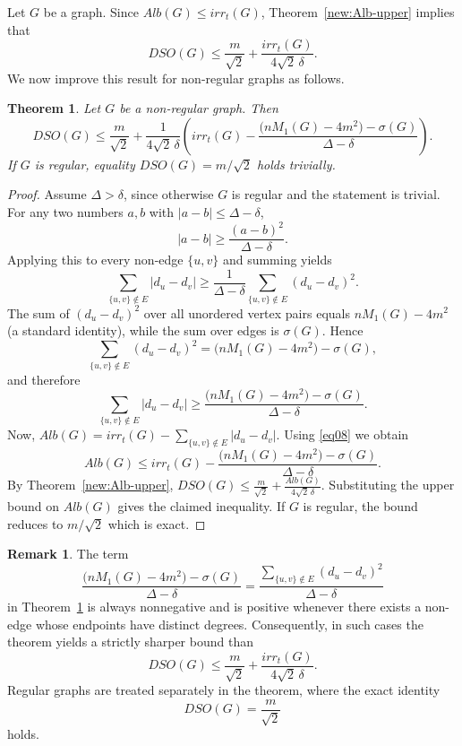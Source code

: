 \documentclass{article}
\newtheorem{theorem}{Theorem}
\theoremstyle{definition}
\newtheorem{remark}{Remark}
\begin{document}
Let $G$ be a graph.
Since $Alb(G) \le irr_t(G)$,  Theorem~\ref{new:Alb-upper} implies that
\[
DSO(G) \le \frac{m}{\sqrt{2}} + \frac{irr_t(G)}{4\sqrt{2}\,\delta}.
\]
We now improve this result for non-regular graphs as follows.
\begin{theorem}\label{new:irr-upper-implicit}
Let $G$ be a non-regular graph.
Then
\[
DSO(G) \le \frac{m}{\sqrt{2}} + \frac{1}{4\sqrt{2}\,\delta}
\left( irr_t(G) - \frac{\bigl(n M_1(G)-4m^2\bigr)-\sigma(G)}{\Delta-\delta} \right).
\]
If $G$ is regular, equality $DSO(G)=m/\sqrt{2}$ holds trivially.
\end{theorem}
\begin{proof}
Assume $\Delta>\delta$, since otherwise $G$ is regular and the statement is trivial. For any two numbers $a,b$ with $|a-b|\le \Delta-\delta$,
\[
|a-b| \ge \frac{(a-b)^2}{\Delta-\delta}.
\]
Applying this to every non-edge $\{u,v\}$ and summing yields
\[
\sum_{\{u,v\}\notin E} |d_u-d_v|
\ge \frac{1}{\Delta-\delta}\sum_{\{u,v\}\notin E} (d_u-d_v)^2.
\]
The sum of $(d_u-d_v)^2$ over all unordered vertex pairs equals $n M_1(G)-4m^2$ (a standard identity), while the sum over edges is $\sigma(G)$.
Hence
\[
\sum_{\{u,v\}\notin E} (d_u-d_v)^2 = \bigl(n M_1(G)-4m^2\bigr)-\sigma(G),
\]
and therefore
\begin{equation}\label{eq08}
\sum_{\{u,v\}\notin E} |d_u-d_v|
\ge \frac{\bigl(n M_1(G)-4m^2\bigr)-\sigma(G)}{\Delta-\delta}. 
\end{equation}
Now, $Alb(G)=irr_t(G)-\sum_{\{u,v\}\notin E}|d_u-d_v|$. Using \eqref{eq08} we obtain
\[
Alb(G) \le irr_t(G) - \frac{\bigl(n M_1(G)-4m^2\bigr)-\sigma(G)}{\Delta-\delta}.
\]
By Theorem~\ref{new:Alb-upper},
$DSO(G) \le \frac{m}{\sqrt{2}} + \frac{Alb(G)}{4\sqrt{2}\,\delta}$.
Substituting the upper bound on $Alb(G)$ gives the claimed inequality.
If $G$ is regular, the bound reduces to $m/\sqrt{2}$ which is exact.
\end{proof}
\begin{remark}
The  term
\[
\frac{\bigl(nM_1(G)-4m^2\bigr)-\sigma(G)}
{\Delta-\delta}
=
\frac{\sum_{\{u,v\}\notin E}(d_u-d_v)^2}
{\Delta-\delta}
\]
in Theorem~\ref{new:irr-upper-implicit}
is always nonnegative and is positive whenever there exists a non-edge
whose endpoints have distinct degrees.
Consequently, in such cases the theorem yields a strictly sharper bound than
\[
DSO(G)\le
\frac{m}{\sqrt2}
+\frac{irr_t(G)}{4\sqrt2\,\delta}.
\]
Regular graphs are treated separately in the theorem, where the exact identity
\[
DSO(G)=\frac{m}{\sqrt2}
\]
holds.
\end{remark}
\end{document}
